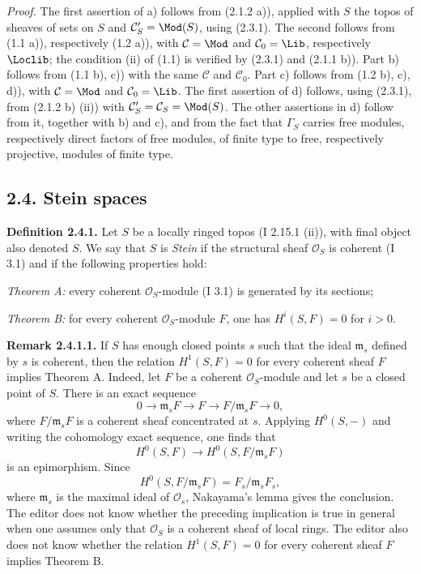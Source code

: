 \emph{Proof.} The first assertion of a) follows from (2.1.2 a)), applied with $S$ the topos of sheaves of sets on $S$ and $\mathcal C'_S=\Mod(S)$, using (2.3.1). The second follows from (1.1 a)), respectively (1.2 a)), with $\mathcal C=\Mod$ and $\mathcal C_0=\Lib$, respectively $\Loclib$; the condition (ii) of (1.1) is verified by (2.3.1) and (2.1.1 b)). Part b) follows from (1.1 b), c)) with the same $\mathcal C$ and $\mathcal C_0$. Part c) follows from (1.2 b), c), d)), with $\mathcal C=\Mod$ and $\mathcal C_0=\Lib$. The first assertion of d) follows, using (2.3.1), from (2.1.2 b) (ii)) with $\mathcal C'_S=\mathcal C_S=\Mod(S)$. The other assertions in d) follow from it, together with b) and c), and from the fact that $\Gamma_S$ carries free modules, respectively direct factors of free modules, of finite type to free, respectively projective, modules of finite type.

\subsection*{2.4. Stein spaces}

\textbf{Definition 2.4.1.} Let $S$ be a locally ringed topos (I 2.15.1 (ii)), with final object also denoted $S$. We say that $S$ is \emph{Stein} if the structural sheaf $\mathcal O_S$ is coherent (I 3.1) and if the following properties hold:

\emph{Theorem A:} every coherent $\mathcal O_S$-module (I 3.1) is generated by its sections;

\emph{Theorem B:} for every coherent $\mathcal O_S$-module $F$, one has $H^i(S,F)=0$ for $i>0$.

\textbf{Remark 2.4.1.1.} If $S$ has enough closed points $s$ such that the ideal $\mathfrak m_s$ defined by $s$ is coherent, then the relation $H^1(S,F)=0$ for every coherent sheaf $F$ implies Theorem A. Indeed, let $F$ be a coherent $\mathcal O_S$-module and let $s$ be a closed point of $S$. There is an exact sequence
\[
0\longrightarrow \mathfrak m_sF\longrightarrow F\longrightarrow F/\mathfrak m_sF\longrightarrow0,
\]
where $F/\mathfrak m_sF$ is a coherent sheaf concentrated at $s$. Applying $H^0(S,-)$ and writing the cohomology exact sequence, one finds that
\[
H^0(S,F)\longrightarrow H^0(S,F/\mathfrak m_sF)
\]
is an epimorphism. Since
\[
H^0(S,F/\mathfrak m_sF)=F_s/\mathfrak m_sF_s,
\]
where $\mathfrak m_s$ is the maximal ideal of $\mathcal O_s$, Nakayama's lemma gives the conclusion. The editor does not know whether the preceding implication is true in general when one assumes only that $\mathcal O_S$ is a coherent sheaf of local rings. The editor also does not know whether the relation $H^1(S,F)=0$ for every coherent sheaf $F$ implies Theorem B.

